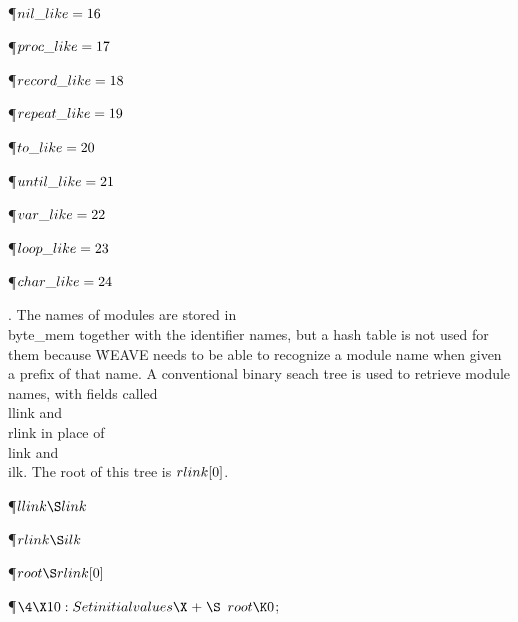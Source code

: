 \P\D {}$\\{nil\_like}=16$\par
\P\D {}$\\{proc\_like}=17$\par
\P\D {}$\\{record\_like}=18$\par
\P\D {}$\\{repeat\_like}=19$\par
\P\D {}$\\{to\_like}=20$\par
\P\D {}$\\{until\_like}=21$\par
\P\D {}$\\{var\_like}=22$\par
\P\D {}$\\{loop\_like}=23$\par
\P\D {}$\\{char\_like}=24$\par
\fi

. The names of modules are stored in \\{byte\_mem} together
with the identifier names, but a hash table is not used for them because
\.{WEAVE} needs to be able to recognize a module name when given a prefix of
that name. A conventional binary seach tree is used to retrieve module names,
with fields called \\{llink} and \\{rlink} in place of \\{link} and \\{ilk}.
The
root of this tree is $\\{rlink}[0]$.

\Y\P\D {}$\\{llink}\S\\{link}$\par
\P\D {}$\\{rlink}\S\\{ilk}$\par
\P\D {}$\\{root}\S\\{rlink}[0]$\par
\Y\P$\4\X10:Set initial values\X\mathrel{+}\S$\6
$\\{root}\K0$;\par
\fi

